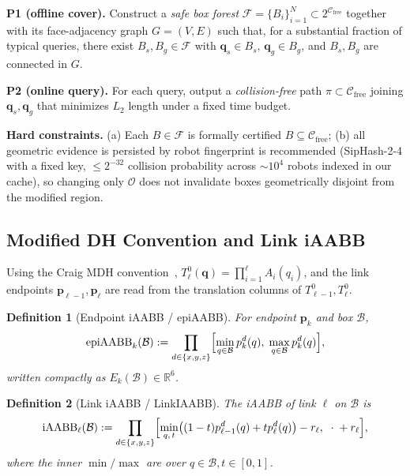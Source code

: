 \documentclass[journal]{IEEEtran}
\newtheorem{definition}{Definition}
\newcommand{\iAABB}{\mathrm{iAABB}}
\newcommand{\Real}{\mathbb{R}}
\newcommand{\Cfree}{\mathcal{C}_{\mathrm{free}}}
\newcommand{\calO}{\mathcal{O}}
\begin{document}
\textbf{P1 (offline cover).} Construct a \emph{safe box forest}
$\mathcal{F}=\{B_i\}_{i=1}^{N}\subset 2^{\Cfree}$ together with its
face-adjacency graph $G=(V,E)$ such that, for a substantial fraction of
typical queries, there exist $B_s,B_g\in\mathcal{F}$ with
$\bm{q}_s\in B_s,\,\bm{q}_g\in B_g$, and $B_s,B_g$ are connected in $G$.

\textbf{P2 (online query).} For each query, output a \emph{collision-free}
path $\pi\subset\Cfree$ joining $\bm{q}_s,\bm{q}_g$ that minimizes
$L_2$ length under a fixed time budget.

\textbf{Hard constraints.} (a) Each $B\in\mathcal{F}$ is formally certified
$B\subseteq\Cfree$; (b) all geometric evidence is persisted by robot
fingerprint is recommended (SipHash-2-4 with a fixed key, $\le 2^{-32}$
collision probability across $\sim 10^4$ robots indexed in our
cache), so changing only $\calO$ does not invalidate
boxes geometrically disjoint from the modified region.

\subsection{Modified DH Convention and Link iAABB}\label{sec:dh}

Using the Craig MDH convention~\cite{craig2005introduction},
$T_\ell^0(\mathbf{q}) = \prod_{i=1}^{\ell} A_i(q_i)$, and the link
endpoints $\bm{p}_{\ell-1},\bm{p}_\ell$ are read from the translation
columns of $T_{\ell-1}^0,T_\ell^0$.

\begin{definition}[Endpoint iAABB / epiAABB]\label{def:epiaabb}
For endpoint $\bm{p}_k$ and box $\mathcal{B}$,
\begin{equation}
\mathrm{epiAABB}_k(\mathcal{B})
:=\prod_{d\in\{x,y,z\}}
\Bigl[\min_{q\in\mathcal{B}} p_k^d(q),\;
\max_{q\in\mathcal{B}} p_k^d(q)\Bigr],
\end{equation}
written compactly as $E_k(\mathcal{B})\in\Real^6$.
\end{definition}

\begin{definition}[Link iAABB / LinkIAABB]\label{def:iaabb}
The iAABB of link $\ell$ on $\mathcal{B}$ is
\begin{equation}\label{eq:linkiaabb_def}
\iAABB_\ell(\mathcal{B})
:=\prod_{d\in\{x,y,z\}}
\Bigl[\min_{q,\,t}\bigl((1-t)p_{\ell-1}^d(q)+tp_\ell^d(q)\bigr) - r_\ell,\;
\;\cdot\;+r_\ell\Bigr],
\end{equation}
where the inner $\min/\max$ are over $q\in\mathcal{B}, t\in[0,1]$.
\end{definition}
\end{document}

